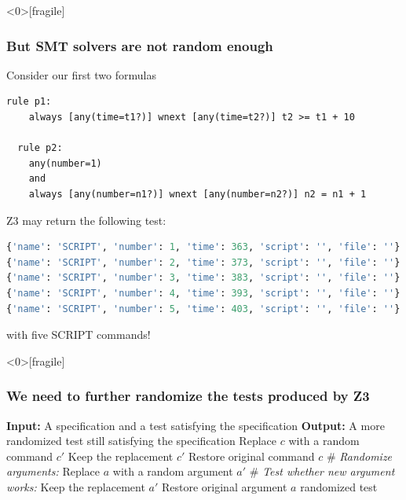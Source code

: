 
\begin{frame}<0>[fragile]
  \frametitle{But SMT solvers are not random enough} \small

\begin{block}{Consider our first two formulas}
\begin{lstlisting}[language=fuzzdsl,frame=single]
  rule p1: 
    always [any(time=t1?)] wnext [any(time=t2?)] t2 >= t1 + 10

  rule p2: 
    any(number=1) 
    and
    always [any(number=n1?)] wnext [any(number=n2?)] n2 = n1 + 1
\end{lstlisting}
\end{block}

\pause
Z3 may return the following test:

\begin{lstlisting}[language=python]
{'name': 'SCRIPT', 'number': 1, 'time': 363, 'script': '', 'file': ''}
{'name': 'SCRIPT', 'number': 2, 'time': 373, 'script': '', 'file': ''}
{'name': 'SCRIPT', 'number': 3, 'time': 383, 'script': '', 'file': ''}
{'name': 'SCRIPT', 'number': 4, 'time': 393, 'script': '', 'file': ''}
{'name': 'SCRIPT', 'number': 5, 'time': 403, 'script': '', 'file': ''}
\end{lstlisting}

with five SCRIPT commands!

\end{frame}


\begin{frame}<0>[fragile]
  \frametitle{We need to further randomize the tests produced by Z3} \small

\begin{algorithmic}[1]
\State \textbf{Input:} A \matl{} specification and a test satisfying the specification 
\State \textbf{Output:} A more randomized test still satisfying the specification
    \State Replace $c$ with a random command $c'$ 
        \State Keep the replacement $c'$
    \Else
        \State Restore original command $c$
        \State \# {\em Randomize arguments:}
          \State Replace $a$ with a random argument $a'$
          \State \# {\em Test whether new argument works:}
            \State Keep the replacement $a'$
          \Else
            \State Restore original argument $a$
          \EndIf
        \EndFor
    \EndIf
\EndFor
\State \Return randomized test
\end{algorithmic}

\end{frame}


